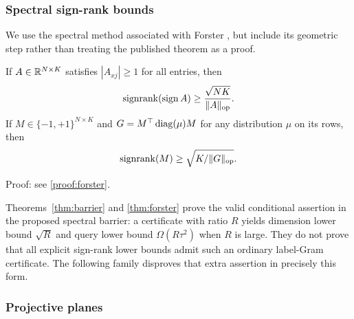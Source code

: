 \subsubsection{Spectral sign-rank bounds}
We use the spectral method associated with Forster \citep{Forster02}, but include its geometric step rather than treating the published theorem as a proof.


\begin{theorem}\label{thm:forster}
If $A\in\mathbb R^{N\times K}$ satisfies $|A_{xj}|\geq1$ for all entries, then
\begin{equation}\label{eq:forster}
 \operatorname{signrank}(\operatorname{sign} A)\geq\frac{\sqrt{NK}}{\|A\|_{\mathrm{op}}}.
\end{equation}
If $M\in\{-1,+1\}^{N\times K}$ and $G=M^\top\operatorname{diag}(\mu)M$ for any distribution $\mu$ on its rows, then
\begin{equation}\label{eq:weighted}
 \operatorname{signrank}(M)\geq\sqrt{K/\|G\|_{\mathrm{op}}}.
\end{equation}
\end{theorem}

\noindent Proof: see \cref{proof:forster}.\par


Theorems~\ref{thm:barrier} and \ref{thm:forster} prove the valid conditional assertion in the proposed spectral barrier: a certificate with ratio $R$ yields dimension lower bound $\sqrt R$ and query lower bound $\Omega(R\tau^2)$ when $R$ is large. They do not prove that all explicit sign-rank lower bounds admit such an ordinary label-Gram certificate. The following family disproves that extra assertion in precisely this form.

\subsubsection{Projective planes}

